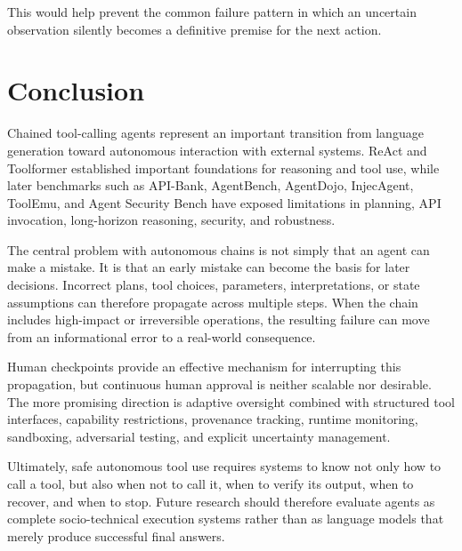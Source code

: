 \documentclass[11pt]{article}
\begin{document}
This would help prevent the common failure pattern in which an uncertain
observation silently becomes a definitive premise for the next action.

\section{Conclusion}

Chained tool-calling agents represent an important transition from language
generation toward autonomous interaction with external systems. ReAct and
Toolformer established important foundations for reasoning and tool use, while later
benchmarks such as API-Bank, AgentBench, AgentDojo, InjecAgent, ToolEmu, and
Agent Security Bench have exposed limitations in planning, API invocation,
long-horizon reasoning, security, and robustness.

The central problem with autonomous chains is not simply that an agent can make a
mistake. It is that an early mistake can become the basis for later decisions.
Incorrect plans, tool choices, parameters, interpretations, or state assumptions can
therefore propagate across multiple steps. When the chain includes high-impact or
irreversible operations, the resulting failure can move from an informational error to a
real-world consequence.

Human checkpoints provide an effective mechanism for interrupting this
propagation, but continuous human approval is neither scalable nor desirable.
The more promising direction is adaptive oversight combined with structured tool
interfaces, capability restrictions, provenance tracking, runtime monitoring,
sandboxing, adversarial testing, and explicit uncertainty management.

Ultimately, safe autonomous tool use requires systems to know not only how to call
a tool, but also when not to call it, when to verify its output, when to recover,
and when to stop. Future research should therefore evaluate agents as complete
socio-technical execution systems rather than as language models that merely
produce successful final answers.



\end{document}
